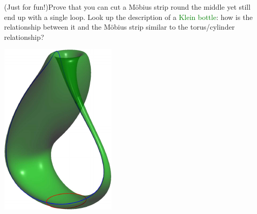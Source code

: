 \begin{exercises}{}{}
\begin{enumerate}
		\begin{minipage}[t]{0.79\linewidth}\vspace{0pt}
			\item (Just for fun!)\lstsp Prove that you can cut a Möbius strip round the middle yet still end up with a single loop.\smallbreak
			Look up the description of a \textcolor{Green}{Klein bottle}: how is the relationship between it and the Möbius strip similar to the torus/cylinder relationship?
		\end{minipage}
		\hfill
		\begin{minipage}[t]{0.2\linewidth}\vspace{0pt}
			\hfill \href{http://www.math.uci.edu/~ndonalds/math13/relations-klein.html}{\includegraphics[scale=0.6]{relations-klein}}
		\end{minipage}
	\end{enumerate}

\end{exercises}